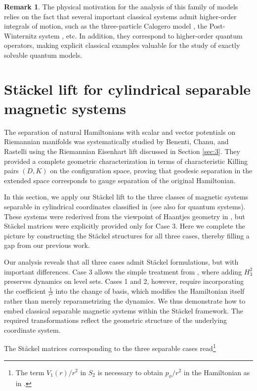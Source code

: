 \documentclass[10pt]{amsart}
\numberwithin{equation}{section}
\theoremstyle{definition}
\newtheorem{remark}{\textbf{Remark}}
\begin{document}
\begin{remark}
	The physical motivation for the analysis of this family of models relies on the fact that several important classical systems admit higher-order integrals of motion, such as the three-particle Calogero model \cite{TT2016SIGMA}, the Post-Winternitz system \cite{TT2022AMPA}, etc. In addition, they correspond to higher-order quantum operators, making explicit classical examples valuable for the study of exactly solvable quantum models.
\end{remark}

\section{St\"ackel lift for cylindrical separable magnetic systems} \label{sec:8}
The separation of natural Hamiltonians with scalar and vector potentials on 
Riemannian manifolds was systematically studied by Benenti, Chanu, and Rastelli 
\cite{Benenti2001} using the Riemannian Eisenhart lift discussed in Section 
\ref{sec:3}. They provided a complete geometric characterization in terms of 
characteristic Killing pairs $(D, K)$ on the configuration space, proving that 
geodesic separation in the extended space corresponds to gauge separation 
 of the original Hamiltonian.

In this section, we apply our Stäckel lift to the three classes of magnetic 
systems separable in cylindrical coordinates classified in \cite{Benenti2001} 
(see also \cite{Shapovalov} for quantum systems). These systems were rederived 
from the viewpoint of Haantjes geometry in \cite{KRTT2024PRA}, but 
Stäckel matrices were explicitly provided only for Case 3. Here we complete the picture by 
constructing the Stäckel structures for all three cases, thereby filling a gap 
from our previous work.

Our analysis reveals that all three cases admit Stäckel formulations, but with important differences. Case 3 allows the simple treatment from \cite{KRTT2024PRA}, where adding $H_{3}^2$  preserves dynamics on level sets. Cases 1 and 2, however, require incorporating the coefficient $\frac{1}{r^2}$ into the change of basis, which modifies the Hamiltonian itself rather than merely reparametrizing the dynamics. We thus demonstrate how to embed classical separable magnetic systems within the St\"ackel framework. The required transformations reflect the geometric structure of the underlying coordinate system.

The St\"ackel matrices corresponding to the three separable cases read\footnote{The term $V_1(r)/r^2$ in $S_2$ is necessary to obtain $p_\phi/r^2$ in the Hamiltonian as in \cite{KRTT2024PRA}.}
\end{document}
